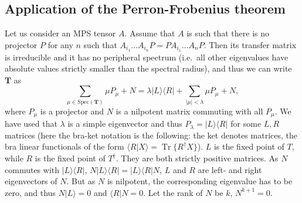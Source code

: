 \documentclass{article}
\newcommand{\tr}{\operatorname{Tr}}
\newcommand{\ket}[1]{\vert #1 \rangle}
\newcommand{\bra}[1]{\langle #1 \vert}
\newcommand{\scalprod}[2]{\langle #1 \vert #2 \rangle}
\begin{document}
\subsection{Application of the Perron-Frobenius theorem}
Let us consider an MPS tensor $A$. Assume that $A$ is such that there is no projector $P$ for any $n$ such that $A_{i_1} \dots A_{i_n} P = PA_{i_1} \dots A_n P$. Then its transfer matrix is irreducible and it has no peripheral spectrum (i.e.\ all other eigenvalues have absolute values strictly smaller than the spectral radius), and thus we can write $\mathbf{T}$ as 
\begin{equation*}
  \sum_{\mu\in \mathrm{Spec}(\mathbf{T})} \mu P_{\mu} + N = \lambda \ket{L}\bra{R} + \sum_{|\mu|<\lambda} \mu P_\mu + N,
\end{equation*} 
where $P_\mu$ is a projector and $N$ is a nilpotent matrix commuting with all $P_\mu$. We have used that $\lambda$ is a simple eigenvector and thus $P_\lambda = \ket{L}\bra{R}$ for some $L,R$ matrices (here the bra-ket notation is the following: the ket denotes matrices, the bra linear functionals of the form $\scalprod{R}{X} = \tr\{R^\dagger X\}$). $L$ is the fixed point of $T$, while $R$ is the fixed point of $T^\dagger$. They are both strictly positive matrices. As $N$ commutes with $\ket{L}\bra{R}$, $N\ket{L} \bra{R} = \ket{L}\bra{R}N$, $L$ and $R$ are left- and right eigenvectors of $N$. But as $N$ is nilpotent, the corresponding eigenvalue has to be zero, and thus $N\ket{L} = 0$ and $\bra{R}N = 0$. Let the rank of $N$ be $k$, $N^{k+1} = 0$. 
\end{document}
